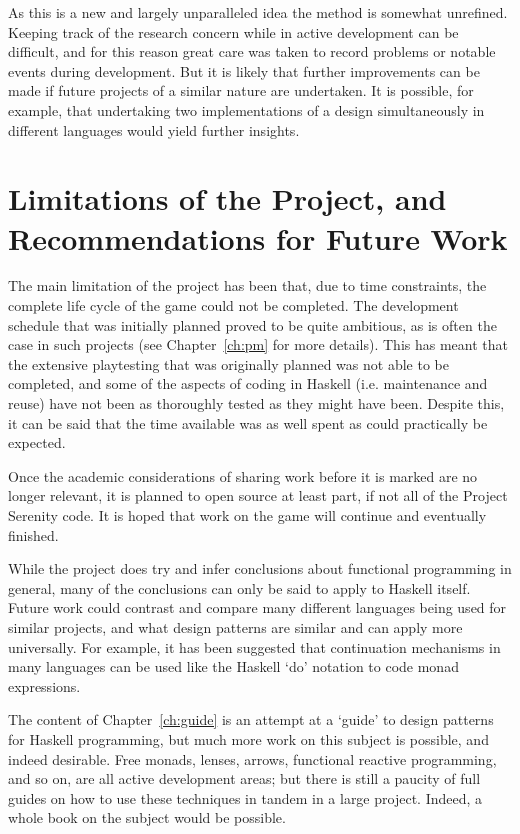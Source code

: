 As this is a new and largely unparalleled idea the method is somewhat unrefined. Keeping track of the research concern while in active development can be difficult, and for this reason great care was taken to record problems or notable events during development. But it is likely that further improvements can be made if future projects of a similar nature are undertaken. It is possible, for example, that undertaking two implementations of a design simultaneously in different languages would yield further insights. 

\section{Limitations of the Project, and Recommendations for Future Work}

The main limitation of the project has been that, due to time constraints, the complete life cycle of the game could not be completed. The development schedule that was initially planned proved to be quite ambitious, as is often the case in such projects (see Chapter~\ref{ch:pm} for more details). This has meant that the extensive playtesting that was originally planned was not able to be completed, and some of the aspects of coding in Haskell (i.e. maintenance and reuse) have not been as thoroughly tested as they might have been. Despite this, it can be said that the time available was as well spent as could practically be expected.

Once the academic considerations of sharing work before it is marked are no longer relevant, it is planned to open source at least part, if not all of the Project Serenity code. It is hoped that work on the game will continue and eventually finished. 

While the project does try and infer conclusions about functional programming in general, many of the conclusions can only be said to apply to Haskell itself. Future work could contrast and compare many different languages being used for similar projects, and what design patterns are similar and can apply more universally. For example, it has been suggested that continuation mechanisms in many languages can be used like the Haskell `do' notation to code monad expressions.\cite{piponi2008}

The content of Chapter~\ref{ch:guide} is an attempt at a `guide' to design patterns for Haskell programming, but much more work on this subject is possible, and indeed desirable. Free monads, lenses, arrows, functional reactive programming, and so on, are all active development areas; but there is still a paucity of full guides on how to use these techniques in tandem in a large project. Indeed, a whole book on the subject would be possible.

